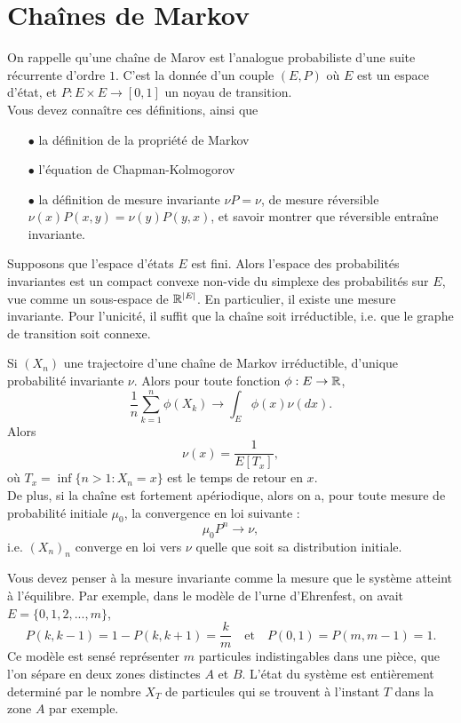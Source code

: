 \section{Chaînes de Markov}

On rappelle qu'une chaîne de Marov est l'analogue probabiliste d'une suite récurrente d'ordre $1$. C'est la donnée d'un couple $(E,P)$ où $E$ est un espace d'état, et $P : E\times E\rightarrow [0,1]$ un noyau de transition.\\

Vous devez connaître ces définitions, ainsi que
\begin{itemize}
\item[$\bullet$] la définition de la propriété de Markov
\item[$\bullet$] l'équation de Chapman-Kolmogorov
\item[$\bullet$] la définition de mesure invariante $\nu P =\nu$, de mesure réversible $\nu(x)P(x,y)=\nu(y)P(y,x)$, et savoir montrer que réversible entraîne invariante.\\
\end{itemize}

Supposons que l'espace d'états $E$ est fini. Alors l'espace des probabilités invariantes est un compact convexe non-vide du simplexe des probabilités sur $E$, vue comme un sous-espace de $\mathbb R^{|E|}$. En particulier, il existe une mesure invariante. Pour l'unicité, il suffit que la chaîne soit irréductible, i.e. que le graphe de transition soit connexe. 

\begin{thm}
Si $(X_n)$ une trajectoire d'une chaîne de Markov irréductible, d'unique probabilité invariante $\nu$. Alors pour toute fonction $\phi :E\rightarrow \mathbb R$, 
\[\frac{1}{n}\sum_{k=1}^n \phi(X_k) \rightarrow \int_E \phi(x)\nu(dx).\]
Alors \[\nu(x)=\frac{1}{E[T_x]},\]
où $T_x=\inf\{n>1 : X_n = x\}$ est le temps de retour en $x$.\\
De plus, si la chaîne est fortement apériodique, alors on a, pour toute mesure de probabilité initiale $\mu_0$, la convergence en loi suivante :
\[\mu_0 P^n \rightarrow \nu, \]
i.e. $(X_n)_n$ converge en loi vers $\nu$ quelle que soit sa distribution initiale.
\end{thm}

Vous devez penser à la mesure invariante comme la mesure que le système atteint à l'équilibre. Par exemple, dans le modèle de l'urne d'Ehrenfest, on avait $E=\{0,1,2,...,m\}$, 
\[P(k,k-1)=1-P(k,k+1)=\frac{k}{m} \quad \text{et}\quad P(0,1)=P(m,m-1)=1.\]
Ce modèle est sensé représenter $m$ particules indistingables dans une pièce, que l'on sépare en deux zones distinctes $A$ et $B$. L'état du système est entièrement determiné par le nombre $X_T$ de particules qui se trouvent à l'instant $T$ dans la zone $A$ par exemple.\\


